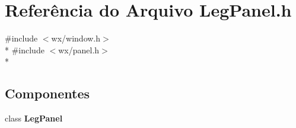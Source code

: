 \section{Referência do Arquivo Leg\+Panel.\+h}
\label{_leg_panel_8h}
{\ttfamily \#include $<$wx/window.\+h$>$}\\*
{\ttfamily \#include $<$wx/panel.\+h$>$}\\*
\subsection*{Componentes}
\begin{DoxyCompactItemize}
\item 
class {\bf Leg\+Panel}
\end{DoxyCompactItemize}
